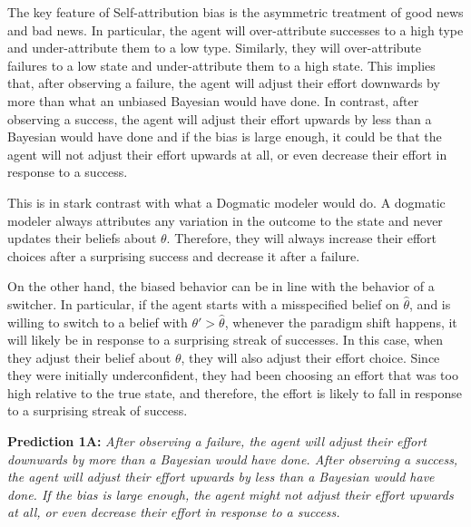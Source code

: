 \documentclass[
  12pt,
]{article}
\begin{document}
The key feature of Self-attribution bias is the asymmetric treatment of
good news and bad news. In particular, the agent will over-attribute
successes to a high type and under-attribute them to a low type.
Similarly, they will over-attribute failures to a low state and
under-attribute them to a high state. This implies that, after observing
a failure, the agent will adjust their effort downwards by more than
what an unbiased Bayesian would have done. In contrast, after observing
a success, the agent will adjust their effort upwards by less than a
Bayesian would have done and if the bias is large enough, it could be
that the agent will not adjust their effort upwards at all, or even
decrease their effort in response to a success.

This is in stark contrast with what a Dogmatic modeler would do. A
dogmatic modeler always attributes any variation in the outcome to the
state and never updates their beliefs about \(\theta\). Therefore, they
will always increase their effort choices after a surprising success and
decrease it after a failure.

On the other hand, the biased behavior can be in line with the behavior
of a switcher. In particular, if the agent starts with a misspecified
belief on \(\hat{\theta}\), and is willing to switch to a belief with
\(\theta'>\hat{\theta}\), whenever the paradigm shift happens, it will
likely be in response to a surprising streak of successes. In this case,
when they adjust their belief about \(\theta\), they will also adjust
their effort choice. Since they were initially underconfident, they had
been choosing an effort that was too high relative to the true state,
and therefore, the effort is likely to fall in response to a surprising
streak of success.

\textbf{Prediction 1A:} \emph{After observing a failure, the agent will
adjust their effort downwards by more than a Bayesian would have done.
After observing a success, the agent will adjust their effort upwards by
less than a Bayesian would have done. If the bias is large enough, the
agent might not adjust their effort upwards at all, or even decrease
their effort in response to a success.}
\end{document}
